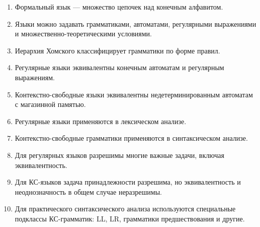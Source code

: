 \documentclass[12pt,a4paper]{article}
\begin{document}
\begin{enumerate}
    \item Формальный язык --- множество цепочек над конечным алфавитом.
    \item Языки можно задавать грамматиками, автоматами, регулярными выражениями и множественно-теоретическими условиями.
    \item Иерархия Хомского классифицирует грамматики по форме правил.
    \item Регулярные языки эквивалентны конечным автоматам и регулярным выражениям.
    \item Контекстно-свободные языки эквивалентны недетерминированным автоматам с магазинной памятью.
    \item Регулярные языки применяются в лексическом анализе.
    \item Контекстно-свободные грамматики применяются в синтаксическом анализе.
    \item Для регулярных языков разрешимы многие важные задачи, включая эквивалентность.
    \item Для КС-языков задача принадлежности разрешима, но эквивалентность и неоднозначность в общем случае неразрешимы.
    \item Для практического синтаксического анализа используются специальные подклассы КС-грамматик: LL, LR, грамматики предшествования и другие.
\end{enumerate}
\end{document}
